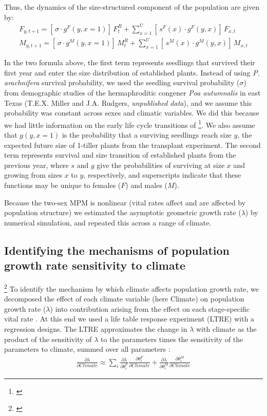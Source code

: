 \documentclass[11pt]{article}
\newcommand{\tom}[2]{{\color{red}{#1}}\footnote{\textit{\color{red}{#2}}}}
\begin{document}
{Thus, the dynamics of the size-structured component of the population are given by:
\begin{align}\label{eq:dynamics}
F_{y,t+1} = [ \, \sigma \cdot g^{F}(y,x=1) ] \, F^{R}_{t} + \sum_{x=1}^{U} 	[ \, s^{F}(x) \cdot g^{F}(y,x)] \, F_{x,t}
\\
M_{y,t+1} = [ \, \sigma \cdot g^{M}(y,x=1) ] \, M^{R}_{t} + \sum_{x=1}^{U} 	[ \,  s^{M}(x) \cdot g^{M}(y,x) ] \, M_{x,t}
\end{align}

\noindent In the two formula above, the first term represents seedlings that survived their first year and enter the size distribution of established plants.
Instead of using \textit{P. arachnifera} survival probability, we used the seedling survival probability ($\sigma$) from demographic studies of the hermaphroditic congener \textit{Poa autumnalis} in east Texas (T.E.X. Miller and J.A. Rudgers, \textit{unpublished data}), and we assume this probability was constant across sexes and climatic variables. 
We did this because we had little information on the early life cycle transitions of \tom{greenhouse-raised transplants}{You have not described these.}. 
We also assume that $g(y,x=1)$ is the probability that a surviving seedlings reach size $y$, the expected future size of 1-tiller plants from the transplant experiment.
The second term represents survival and size transition of established plants from the previous year, where $s$ and $g$ give the probabilities of surviving at size $x$ and growing from sizes $x$ to $y$, respectively, and superscripts indicate that these functions may be unique to females ($F$) and males ($M$).

Because the two-sex MPM is nonlinear (vital rates affect and are affected by population structure) we estimated the asymptotic geometric growth rate ($\lambda$) by numerical simulation, and repeated this across a range of climate.

\subsection*{Identifying the mechanisms of population growth rate sensitivity to climate }
\tom{}{I don't think the LTRE analysis is adequately motivated by the Intro.}
To identify the mechanism by which climate affects population growth rate, we decomposed the effect of each climate variable (here Climate) on population growth rate ($\lambda$) into contribution arising from the effect on each stage-specific vital rate \citep{caswell2000matrix}.
At this end we used a life table response experiment (LTRE) with a regression designs. 
The LTRE approximates the change in $\lambda$ with climate  as the product of the sensitivity of $\lambda$ to the parameters times the sensitivity of the parameters to climate, summed over all parameters \citep{caswell1989analysis}:
\begin{align}\label{eq:ltre}
\frac{\partial \lambda}{\partial Climate} \approx \sum_{i} \frac{\partial \lambda}{\partial \theta^{F}_{i}} \frac{\partial \theta^{F}_{i}}{\partial Climate} + \frac{\partial \lambda}{\partial \theta^{M}_{i}} \frac{\partial \theta^{M}_{i}}{\partial Climate}
\end{align}

}
\end{document}
